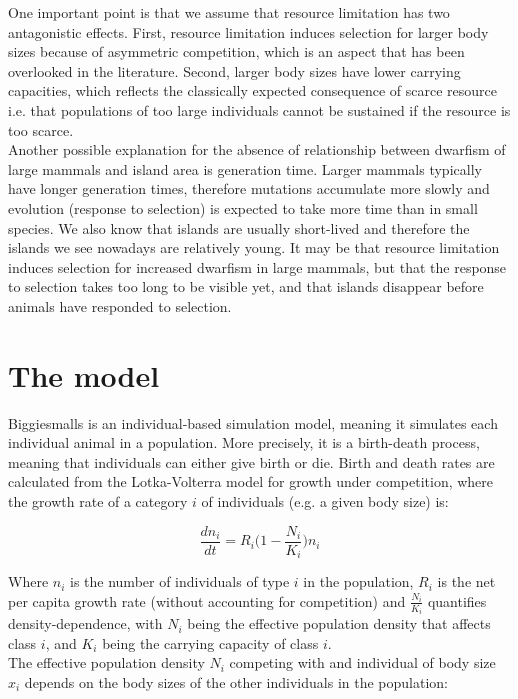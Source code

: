\documentclass[12pt]{article}
\begin{document}
One important point is that we assume that resource limitation has two antagonistic effects. First, resource limitation induces selection for larger body sizes because of asymmetric competition, which is an aspect that has been overlooked in the literature. Second, larger body sizes have lower carrying capacities, which reflects the classically expected consequence of scarce resource i.e. that populations of too large individuals cannot be sustained if the resource is too scarce.\\

Another possible explanation for the absence of relationship between dwarfism of large mammals and island area is generation time. Larger mammals typically have longer generation times, therefore mutations accumulate more slowly and evolution (response to selection) is expected to take more time than in small species. We also know that islands are usually short-lived and therefore the islands we see nowadays are relatively young. It may be that resource limitation induces selection for increased dwarfism in large mammals, but that the response to selection takes too long to be visible yet, and that islands disappear before animals have responded to selection.\\



\section{The model}

Biggiesmalls is an individual-based simulation model, meaning it simulates each individual animal in a population. More precisely, it is a birth-death process, meaning that individuals can either give birth or die. Birth and death rates are calculated from the Lotka-Volterra model for growth under competition, where the growth rate of a category $i$ of individuals (e.g. a given body size) is:

\[
\frac{dn_i}{dt} = R_i \Bigg( 1 - \frac{N_i}{K_i} \Bigg) n_i
\]

Where $n_i$ is the number of individuals of type $i$ in the population, $R_i$ is the net per capita growth rate (without accounting for competition) and $\frac{N_i}{K_i}$ quantifies density-dependence, with $N_i$ being the effective population density that affects class $i$, and $K_i$ being the carrying capacity of class $i$.\\

The effective population density $N_i$ competing with and individual of body size $x_i$ depends on the body sizes of the other individuals in the population:
\end{document}
